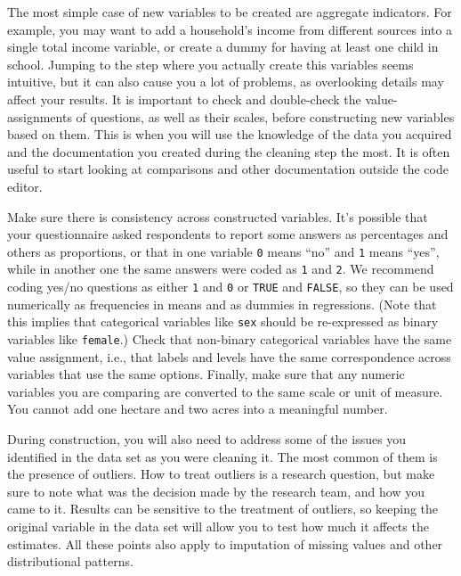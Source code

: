 The most simple case of new variables to be created are aggregate indicators.
For example, you may want to add a household's income from different sources into a single total income variable,
or create a dummy for having at least one child in school.
Jumping to the step where you actually create this variables seems intuitive,
but it can also cause you a lot of problems,
as overlooking details may affect your results.
It is important to check and double-check the value-assignments of questions,
as well as their scales, before constructing new variables based on them.
This is when you will use the knowledge of the data you acquired and the documentation you created during the cleaning step the most.
It is often useful to start looking at comparisons and other documentation outside the code editor.

Make sure there is consistency across constructed variables.
It's possible that your questionnaire asked respondents to report some answers as percentages and others as proportions,
or that in one variable \texttt{0} means ``no'' and \texttt{1} means ``yes'',
while in another one the same answers were coded as \texttt{1} and \texttt{2}.
We recommend coding yes/no questions as either \texttt{1} and \texttt{0} or \texttt{TRUE} and \texttt{FALSE},
so they can be used numerically as frequencies in means and as dummies in regressions.
(Note that this implies that categorical variables like \texttt{sex}
should be re-expressed as binary variables like \texttt{female}.)
Check that non-binary categorical variables have the same value assignment, i.e.,
that labels and levels have the same correspondence across variables that use the same options.
Finally, make sure that any numeric variables you are comparing are converted to the same scale or unit of measure.
You cannot add one hectare and two acres into a meaningful number.

During construction, you will also need to address some of the issues
you identified in the data set as you were cleaning it.
The most common of them is the presence of outliers.
How to treat outliers is a research question,
but make sure to note what was the decision made by the research team,
and how you came to it.
Results can be sensitive to the treatment of outliers,
so keeping the original variable in the data set will allow you to test how much it affects the estimates.
All these points also apply to imputation of missing values and other distributional patterns.

